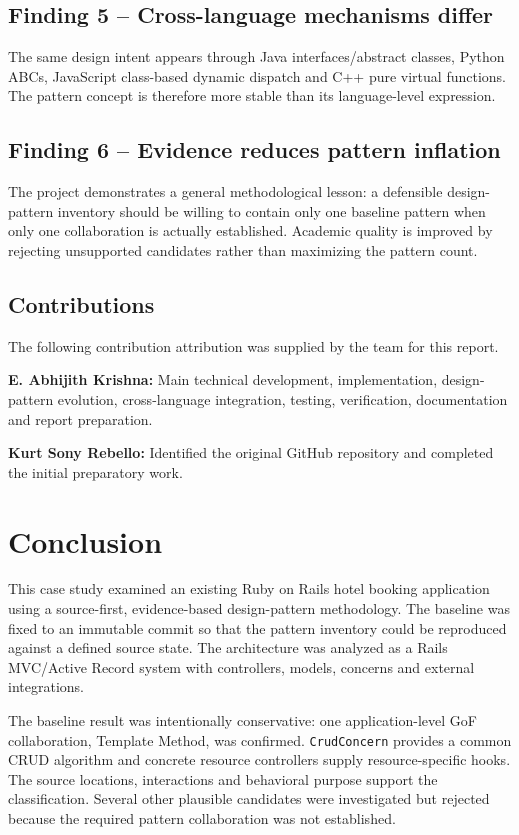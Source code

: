 \documentclass[10pt,a4paper]{article}
\newcommand{\code}[1]{\texttt{\small #1}}
\begin{document}
\subsection{Finding 5 -- Cross-language mechanisms differ}

The same design intent appears through Java interfaces/abstract classes, Python ABCs, JavaScript class-based dynamic dispatch and C++ pure virtual functions. The pattern concept is therefore more stable than its language-level expression.

\subsection{Finding 6 -- Evidence reduces pattern inflation}

The project demonstrates a general methodological lesson: a defensible design-pattern inventory should be willing to contain only one baseline pattern when only one collaboration is actually established. Academic quality is improved by rejecting unsupported candidates rather than maximizing the pattern count.

\subsection{Contributions}

The following contribution attribution was supplied by the team for this report.

\textbf{E. Abhijith Krishna:} Main technical development, implementation, design-pattern evolution, cross-language integration, testing, verification, documentation and report preparation.

\textbf{Kurt Sony Rebello:} Identified the original GitHub repository and completed the initial preparatory work.

\section{Conclusion}

This case study examined an existing Ruby on Rails hotel booking application using a source-first, evidence-based design-pattern methodology. The baseline was fixed to an immutable commit so that the pattern inventory could be reproduced against a defined source state. The architecture was analyzed as a Rails MVC/Active Record system with controllers, models, concerns and external integrations.

The baseline result was intentionally conservative: one application-level GoF collaboration, Template Method, was confirmed. \code{CrudConcern} provides a common CRUD algorithm and concrete resource controllers supply resource-specific hooks. The source locations, interactions and behavioral purpose support the classification. Several other plausible candidates were investigated but rejected because the required pattern collaboration was not established.
\end{document}

